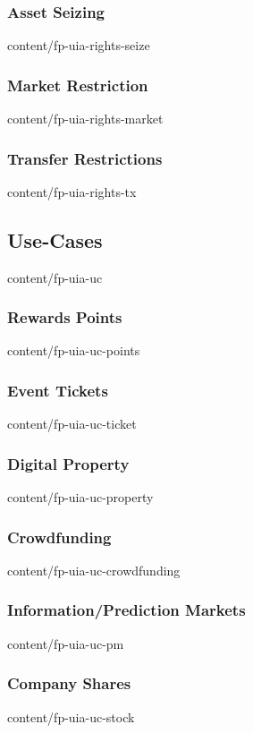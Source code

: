 \documentclass{btswhitepaper}
\begin{document}
\subsubsection  { Asset Seizing                                    }  { content/fp-uia-rights-seize    } 
\subsubsection  { Market Restriction                               }  { content/fp-uia-rights-market   } 
\subsubsection  { Transfer Restrictions                            }  { content/fp-uia-rights-tx       } 
\subsection     { Use-Cases                                        }  { content/fp-uia-uc              } 
\subsubsection  { Rewards Points                                   }  { content/fp-uia-uc-points       } 
\subsubsection  { Event Tickets                                    }  { content/fp-uia-uc-ticket       } 
\subsubsection  { Digital Property                                 }  { content/fp-uia-uc-property     } 
\subsubsection  { Crowdfunding                                     }  { content/fp-uia-uc-crowdfunding } 
\subsubsection  { Information/Prediction Markets                   }  { content/fp-uia-uc-pm           } 
\subsubsection  { Company Shares                                   }  { content/fp-uia-uc-stock        } 
\end{document}
